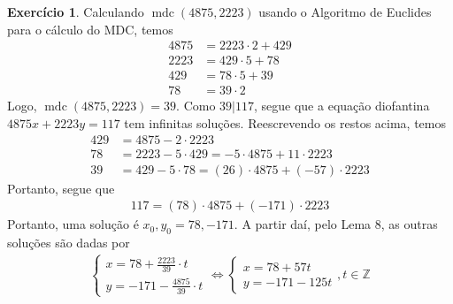 \documentclass[a4paper,12pt]{article}
\DeclareMathOperator{\mdc}{mdc}
\theoremstyle{definition}
\newtheorem{exercise}{Exercício}%
\begin{document}
	\begin{exercise}
		Calculando $\mdc(4875, 2223)$ usando o Algoritmo de Euclides para o cálculo do MDC, temos
		\begin{align*}
		4875 &= 2223\cdot 2 + 429 \\
		2223 &= 429\cdot 5 + 78 \\
		429 &= 78\cdot 5 + 39 \\
		78 &= 39\cdot 2 
		\end{align*}
		Logo, $\mdc(4875, 2223) = 39$. Como $39|117$, segue que a equação diofantina $4875x + 2223y = 117$ tem infinitas soluções. Reescrevendo os restos acima, temos
		\begin{align*}
		429 &= 4875 - 2\cdot 2223 \\
		78 &= 2223 - 5\cdot 429 = -5\cdot 4875 + 11\cdot 2223 \\
		39 &= 429 - 5\cdot 78 = (26)\cdot 4875 + (-57)\cdot 2223
		\end{align*}
		Portanto, segue que 
		\begin{align*}
		117 = (78)\cdot 4875 + (-171)\cdot 2223
		\end{align*}
		Portanto, uma solução é $x_0, y_0 = 78, -171$. A partir daí, pelo Lema 8, as outras soluções são dadas por
		\begin{align*}
		\begin{cases}
		x = 78 + \displaystyle{ \frac{2223}{39} }\cdot t \\
		y = -171 - \displaystyle{ \frac{4875}{39} }\cdot t
		\end{cases} \Leftrightarrow \begin{cases}
		x = 78 + 57t \\
		y = -171 - 125t
		\end{cases}, t\in\mathbb{Z}
		\end{align*}
	\end{exercise}
\end{document}
